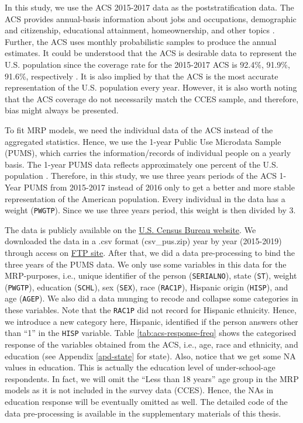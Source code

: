 \documentclass{monashthesis}
\begin{document}
In this study, we use the ACS 2015-2017 data as the poststratification data. The ACS provides annual-basis information about jobs and occupations, demographic and citizenship, educational attainment, homeownership, and other topics \autocite{acs_data_about}. Further, the ACS uses monthly probabilistic samples to produce the annual estimates. It could be understood that the ACS is desirable data to represent the U.S. population since the coverage rate for the 2015-2017 ACS is 92.4\%, 91.9\%, 91.6\%, respectively \autocite{acs_coverage_rate}. It is also implied by \textcite{GaoYuxiang2021IMRa} that the ACS is the most accurate representation of the U.S. population every year. However, it is also worth noting that the ACS coverage do not necessarily match the CCES sample, and therefore, bias might always be presented.

To fit MRP models, we need the individual data of the ACS instead of the aggregated statistics. Hence, we use the 1-year Public Use Microdata Sample (PUMS), which carries the information/records of individual people on a yearly basis. The 1-year PUMS data reflects approximately one percent of the U.S. population \autocite{pums_metadata}. Therefore, in this study, we use three years periods of the ACS 1-Year PUMS from 2015-2017 instead of 2016 only to get a better and more stable representation of the American population. Every individual in the data has a weight (\texttt{PWGTP}). Since we use three years period, this weight is then divided by 3.

The data is publicly available on the \href{https://www.census.gov/programs-surveys/acs/microdata/access.2015.html}{U.S. Census Bureau website}. We downloaded the data in a .csv format (csv\_pus.zip) year by year (2015-2019) through access on \href{https://www2.census.gov/programs-surveys/acs/data/pums/2015/1-Year/}{FTP site}. After that, we did a data pre-processing to bind the three years of the PUMS data. We only use some variables in this data for the MRP-purposes, i.e., unique identifier of the person (\texttt{SERIALNO}), state (\texttt{ST}), weight (\texttt{PWGTP}), education (\texttt{SCHL}), sex (\texttt{SEX}), race (\texttt{RAC1P}), Hispanic origin (\texttt{HISP}), and age (\texttt{AGEP}). We also did a data munging to recode and collapse some categories in these variables. Note that the \texttt{RAC1P} did not record for Hispanic ethnicity. Hence, we introduce a new category here, Hispanic, identified if the person answers other than ``1'' in the \texttt{HISP} variable. Table \ref{tab:acs-response-freq} shows the categorised response of the variables obtained from the ACS, i.e., age, race and ethnicity, and education (see Appendix \ref{apd-state} for state). Also, notice that we get some NA values in education. This is actually the education level of under-school-age respondents. In fact, we will omit the ``Less than 18 years'' age group in the MRP models as it is not included in the survey data (CCES). Hence, the NAs in education response will be eventually omitted as well. The detailed code of the data pre-processing is available in the supplementary materials of this thesis.
\end{document}
